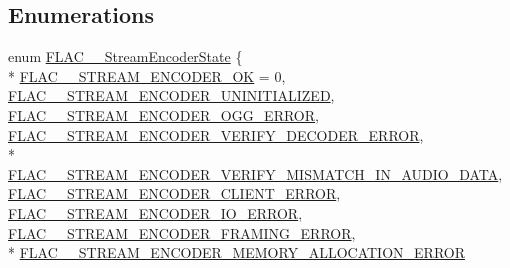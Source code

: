 \subsection*{Enumerations}
\begin{DoxyCompactItemize}
\item 
enum \hyperlink{group__flac__stream__encoder_gac5e9db4fc32ca2fa74abd9c8a87c02a5}{F\+L\+A\+C\+\_\+\+\_\+\+Stream\+Encoder\+State} \{ \\*
\hyperlink{group__flac__stream__encoder_ggac5e9db4fc32ca2fa74abd9c8a87c02a5a3a6666ae61a64d955341cec285695bf6}{F\+L\+A\+C\+\_\+\+\_\+\+S\+T\+R\+E\+A\+M\+\_\+\+E\+N\+C\+O\+D\+E\+R\+\_\+\+OK} = 0, 
\hyperlink{group__flac__stream__encoder_ggac5e9db4fc32ca2fa74abd9c8a87c02a5a04912e04a3c57d3c53de34742f96d635}{F\+L\+A\+C\+\_\+\+\_\+\+S\+T\+R\+E\+A\+M\+\_\+\+E\+N\+C\+O\+D\+E\+R\+\_\+\+U\+N\+I\+N\+I\+T\+I\+A\+L\+I\+Z\+ED}, 
\hyperlink{group__flac__stream__encoder_ggac5e9db4fc32ca2fa74abd9c8a87c02a5abb312cc8318c7a541cadacd23ceb3bbb}{F\+L\+A\+C\+\_\+\+\_\+\+S\+T\+R\+E\+A\+M\+\_\+\+E\+N\+C\+O\+D\+E\+R\+\_\+\+O\+G\+G\+\_\+\+E\+R\+R\+OR}, 
\hyperlink{group__flac__stream__encoder_ggac5e9db4fc32ca2fa74abd9c8a87c02a5a4cb80be4f83eb71f04e74968af1d259e}{F\+L\+A\+C\+\_\+\+\_\+\+S\+T\+R\+E\+A\+M\+\_\+\+E\+N\+C\+O\+D\+E\+R\+\_\+\+V\+E\+R\+I\+F\+Y\+\_\+\+D\+E\+C\+O\+D\+E\+R\+\_\+\+E\+R\+R\+OR}, 
\\*
\hyperlink{group__flac__stream__encoder_ggac5e9db4fc32ca2fa74abd9c8a87c02a5a011e3d8b2d02a940bfd0e59c05cf5ae0}{F\+L\+A\+C\+\_\+\+\_\+\+S\+T\+R\+E\+A\+M\+\_\+\+E\+N\+C\+O\+D\+E\+R\+\_\+\+V\+E\+R\+I\+F\+Y\+\_\+\+M\+I\+S\+M\+A\+T\+C\+H\+\_\+\+I\+N\+\_\+\+A\+U\+D\+I\+O\+\_\+\+D\+A\+TA}, 
\hyperlink{group__flac__stream__encoder_ggac5e9db4fc32ca2fa74abd9c8a87c02a5a8c2b2e9efb43a4f9b25b1d2bd9af5f23}{F\+L\+A\+C\+\_\+\+\_\+\+S\+T\+R\+E\+A\+M\+\_\+\+E\+N\+C\+O\+D\+E\+R\+\_\+\+C\+L\+I\+E\+N\+T\+\_\+\+E\+R\+R\+OR}, 
\hyperlink{group__flac__stream__encoder_ggac5e9db4fc32ca2fa74abd9c8a87c02a5af0e4738522e05a7248435c7148f58f91}{F\+L\+A\+C\+\_\+\+\_\+\+S\+T\+R\+E\+A\+M\+\_\+\+E\+N\+C\+O\+D\+E\+R\+\_\+\+I\+O\+\_\+\+E\+R\+R\+OR}, 
\hyperlink{group__flac__stream__encoder_ggac5e9db4fc32ca2fa74abd9c8a87c02a5a2c2937b7f1600a4ac7c84fc70ab34cf1}{F\+L\+A\+C\+\_\+\+\_\+\+S\+T\+R\+E\+A\+M\+\_\+\+E\+N\+C\+O\+D\+E\+R\+\_\+\+F\+R\+A\+M\+I\+N\+G\+\_\+\+E\+R\+R\+OR}, 
\\*
\hyperlink{group__flac__stream__encoder_ggac5e9db4fc32ca2fa74abd9c8a87c02a5a35db99d9958bd6c2301a04715fbc44fd}{F\+L\+A\+C\+\_\+\+\_\+\+S\+T\+R\+E\+A\+M\+\_\+\+E\+N\+C\+O\+D\+E\+R\+\_\+\+M\+E\+M\+O\+R\+Y\+\_\+\+A\+L\+L\+O\+C\+A\+T\+I\+O\+N\+\_\+\+E\+R\+R\+OR}

\end{DoxyCompactItemize}
